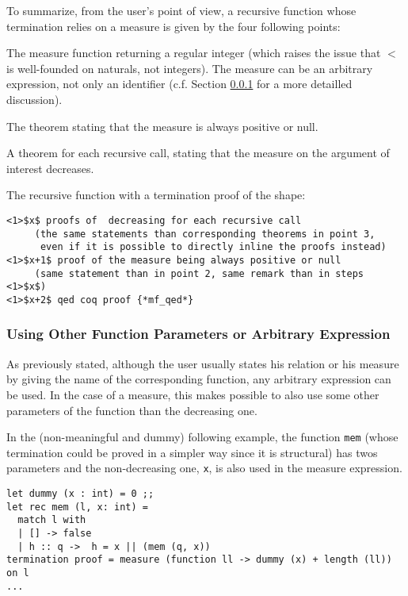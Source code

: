 To summarize, from the user's point of view, a recursive function
whose termination relies on a measure is given by the four following
points:
\begin{compact-enumerate}
\item The measure function returning a regular integer (which
  raises the issue that $<$ is well-founded on naturals, not integers). The
  measure can be an arbitrary expression, not only an identifier
  (c.f. Section \ref{measure-arbitrary-expr} for a more detailled
        discussion).
\item The theorem stating that the measure is always positive or null.
\item A theorem for each recursive call, stating that the measure on the
  argument of interest decreases.
\item The recursive function with a termination proof of the shape:
  \noindent
  {\scriptsize
  \begin{lstlisting}[mathescape=true,frame=none]
<1>$x$ proofs of  decreasing for each recursive call
     (the same statements than corresponding theorems in point 3,
      even if it is possible to directly inline the proofs instead)
<1>$x+1$ proof of the measure being always positive or null
     (same statement than in point 2, same remark than in steps <1>$x$)
<1>$x+2$ qed coq proof {*mf_qed*}
  \end{lstlisting}
  }
\end{compact-enumerate}



\subsubsection{Using Other Function Parameters or Arbitrary Expression}
\label{measure-arbitrary-expr}
As previously stated, although the user usually states his relation or his
measure by giving the name of the corresponding function, any arbitrary
expression can be used. In the case of a measure, this makes possible
to also use some other parameters of the function than the decreasing one.

In the (non-meaningful and dummy) following example, the function
{\tt mem} (whose termination could be proved in a simpler way since it
is structural) has twos parameters and the non-decreasing one, {\tt x}, is
also used in the measure expression.

\noindent
{\scriptsize
\begin{lstlisting}
let dummy (x : int) = 0 ;;
let rec mem (l, x: int) =
  match l with
  | [] -> false
  | h :: q ->  h = x || (mem (q, x))
termination proof = measure (function ll -> dummy (x) + length (ll)) on l
...
\end{lstlisting}
}

